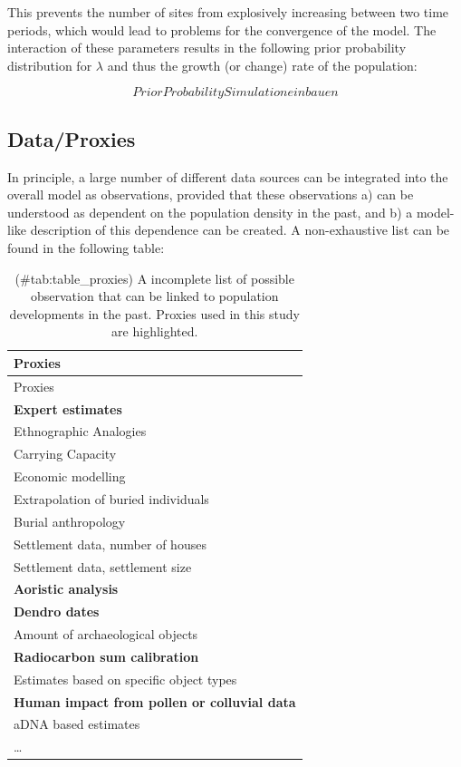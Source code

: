 \documentclass[
]{article}
\begin{document}
This prevents the number of sites from explosively increasing between two time periods, which would lead to problems for the convergence of the model. The interaction of these parameters results in the following prior probability distribution for \(\lambda\) and thus the growth (or change) rate of the population:

\[Prior Probability Simulation einbauen\]

\hypertarget{dataproxies}{%
\subsection{Data/Proxies}\label{dataproxies}}

In principle, a large number of different data sources can be integrated into the overall model as observations, provided that these observations a) can be understood as dependent on the population density in the past, and b) a model-like description of this dependence can be created. A non-exhaustive list can be found in the following table:

\begin{longtable}[]{@{}l@{}}
\caption{(\#tab:table\_proxies) A incomplete list of possible observation that can be linked to population developments in the past. Proxies used in this study are highlighted.}\tabularnewline
\toprule
Proxies \\
\midrule
\endfirsthead
\toprule
Proxies \\
\midrule
\endhead
\textbf{Expert estimates} \\
Ethnographic Analogies \\
Carrying Capacity \\
Economic modelling \\
Extrapolation of buried individuals \\
Burial anthropology \\
Settlement data, number of houses \\
Settlement data, settlement size \\
\textbf{Aoristic analysis} \\
\textbf{Dendro dates} \\
Amount of archaeological objects \\
\textbf{Radiocarbon sum calibration} \\
Estimates based on specific object types \\
\textbf{Human impact from pollen or colluvial data} \\
aDNA based estimates \\
\ldots{} \\
\bottomrule
\end{longtable}
\end{document}
